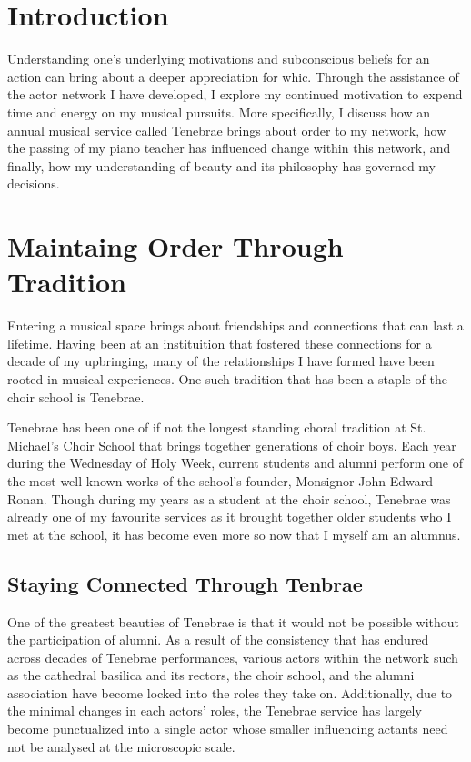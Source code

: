 \documentclass{article} %
\begin{document}
\begin{multicols}{2}

\section{Introduction}

Understanding one's underlying motivations and subconscious beliefs for an action can bring about a deeper appreciation for whic.
Through the assistance of the actor network I have developed, I explore my continued motivation to expend time and energy on my musical pursuits.
More specifically, I discuss how an annual musical service called Tenebrae brings about order to my network, how the passing of my piano teacher has influenced change within this network, and finally, how my understanding of beauty and its philosophy has governed my decisions.

\section{Maintaing Order Through Tradition}

Entering a musical space brings about friendships and connections that can last a lifetime.
Having been at an instituition that fostered these connections for a decade of my upbringing, many of the relationships I have formed have been rooted in musical experiences.
One such tradition that has been a staple of the choir school is Tenebrae.

Tenebrae has been one of if not the longest standing choral tradition at St. Michael's Choir School that brings together generations of choir boys.
Each year during the Wednesday of Holy Week, current students and alumni perform one of the most well-known works of the school's founder, Monsignor John Edward Ronan.
Though during my years as a student at the choir school, Tenebrae was already one of my favourite services as it brought together older students who I met at the school, it has become even more so now that I myself am an alumnus.

\subsection{Staying Connected Through Tenbrae}

One of the greatest beauties of Tenebrae is that it would not be possible without the participation of alumni.
As a result of the consistency that has endured across decades of Tenebrae performances, various actors within the network such as the cathedral basilica and its rectors, the choir school, and the alumni association have become locked into the roles they take on.
Additionally, due to the minimal changes in each actors' roles, the Tenebrae service has largely become punctualized into a single actor whose smaller influencing actants need not be analysed at the microscopic scale.


\end{multicols}
\end{document}
